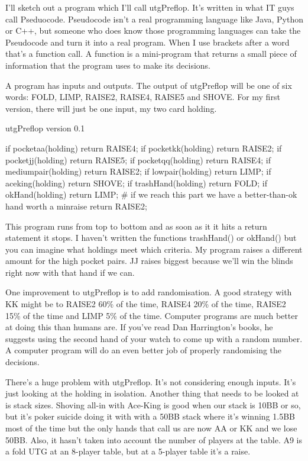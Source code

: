 I'll sketch out a program which I'll call utgPreflop. It's written
in what IT guys call Pseduocode. Pseudocode isn't a real programming
language like Java, Python or C++, but someone who does know those
programming languages can take the Pseudocode and turn it into a real
program. When I use brackets after a word that's a function call.
A function is a mini-program that returns a small piece of information
that the program uses to make its decisions.

A program has inputs and outputs. The output of utgPreflop will
be one of six words: FOLD, LIMP, RAISE2, RAISE4, RAISE5 and SHOVE.
For my first version, there will just be one input, my two card
holding.

utgPreflop version 0.1


if pocketaa(holding) return RAISE4;
if pocketkk(holding) return RAISE2;
if pocketjj(holding) return RAISE5;
if pocketqq(holding) return RAISE4;
if mediumpair(holding) return RAISE2;
if lowpair(holding) return LIMP;
if aceking(holding) return SHOVE;
if trashHand(holding) return FOLD;
if okHand(holding) return LIMP;
\# if we reach this part we have a better-than-ok hand worth a minraise
return RAISE2;

This program runs from top to bottom and as soon as it it hits a
return statement it stops. I haven't written the functions
trashHand() or okHand() but you can imagine what holdings
meet which criteria. My program raises a different amount
for the high pocket pairs. JJ raises biggest because we'll win the
blinds right now with that hand if we can.

One improvement to utgPreflop is to add randomisation. A good strategy
with KK might be to RAISE2 60\% of the time, RAISE4 20\% of the time,
RAISE2 15\% of the time and LIMP 5\% of the time. Computer programs
are much better at doing this than humans are. If you've read
Dan Harrington's books, he suggests using the second hand of your
watch to come up with a random number. A computer program will do an
even better job of properly randomising the decisions.

There's a huge problem with utgPreflop. It's not considering enough
inputs. It's just looking at the holding in isolation. Another thing
that needs to be looked at is stack sizes. Shoving all-in with
Ace-King is good when our stack is 10BB or so, but it's poker suicide
doing it with with a 50BB stack where it's winning 1.5BB most of the
time but the only hands that call us are now AA or KK and we lose 50BB.
Also, it hasn't taken into account the number of players at
the table. A9 is a fold UTG at an 8-player table, but at a 5-player
table it's a raise.

